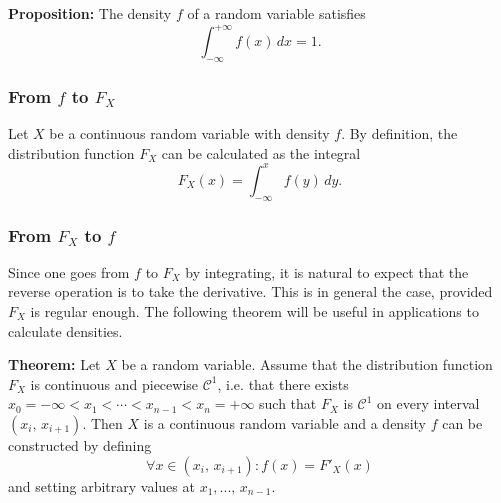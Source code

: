 \documentclass[a4paper]{extarticle}
\begin{document}
\begin{cbox}
    \textbf{Proposition:} The density \(f\) of a random variable satisfies
    \[
        \int_{- \infty}^{+ \infty} f(x) \, dx = 1.
    \]
\end{cbox}

\subsubsection{From \(f\) to \(F_X\)}

Let \(X\) be a continuous random variable with density \(f\). By definition, the distribution function \(F_X\) can be calculated as the integral
\[
    F_X(x) = \int_{- \infty}^{x} f(y) \, dy.
\]

\subsubsection{From \(F_X\) to \(f\)}

Since one goes from \(f\) to \(F_X\) by integrating, it is natural to expect that the reverse operation is to take the derivative. This is in general the case, provided \(F_X\) is regular enough. The following theorem will be useful in applications to calculate densities.

\begin{tbox}
    \textbf{Theorem:} Let \(X\) be a random variable. Assume that the distribution function \(F_X\) is continuous and piecewise \(\mathcal{C}^1\), i.e. that there exists \(x_0 = - \infty < x_1 < \cdots < x_{n-1} < x_n = + \infty\) such that \(F_X\) is \(\mathcal{C}^1\) on every interval \((x_i, \, x_{i + 1})\). Then \(X\) is a continuous random variable and a density \(f\) can be constructed by defining
    \[
        \forall x \in (x_i, \, x_{i + 1}) : f(x) = F'_X(x)
    \]
    and setting arbitrary values at \(x_1,..., \, x_{n-1}\).
\end{tbox}
\end{document}
